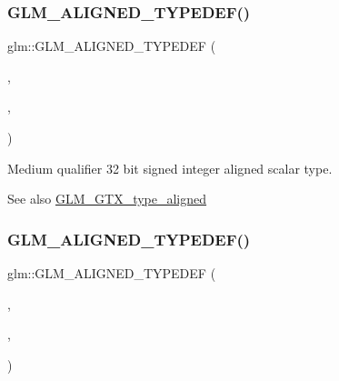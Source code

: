 \subsubsection{\texorpdfstring{G\+L\+M\+\_\+\+A\+L\+I\+G\+N\+E\+D\+\_\+\+T\+Y\+P\+E\+D\+E\+F()}{GLM\_ALIGNED\_TYPEDEF()}\hspace{0.1cm}{\footnotesize\ttfamily [15/209]}}
{\footnotesize\ttfamily glm\+::\+G\+L\+M\+\_\+\+A\+L\+I\+G\+N\+E\+D\+\_\+\+T\+Y\+P\+E\+D\+EF (\begin{DoxyParamCaption}\item[{\mbox{\hyperlink{group__gtc__type__precision_ga0660a752402702f420f13c686a7fff29}{mediump\+\_\+int32}}}]{,  }\item[{aligned\+\_\+mediump\+\_\+int32}]{,  }\item[{4}]{ }\end{DoxyParamCaption})}

Medium qualifier 32 bit signed integer aligned scalar type. \begin{DoxySeeAlso}{See also}
\mbox{\hyperlink{group__gtx__type__aligned}{G\+L\+M\+\_\+\+G\+T\+X\+\_\+type\+\_\+aligned}} 
\end{DoxySeeAlso}
\mbox{\label{group__gtx__type__aligned_gad9e5babb1dd3e3531b42c37bf25dd951}} 
\subsubsection{\texorpdfstring{G\+L\+M\+\_\+\+A\+L\+I\+G\+N\+E\+D\+\_\+\+T\+Y\+P\+E\+D\+E\+F()}{GLM\_ALIGNED\_TYPEDEF()}\hspace{0.1cm}{\footnotesize\ttfamily [16/209]}}
{\footnotesize\ttfamily glm\+::\+G\+L\+M\+\_\+\+A\+L\+I\+G\+N\+E\+D\+\_\+\+T\+Y\+P\+E\+D\+EF (\begin{DoxyParamCaption}\item[{\mbox{\hyperlink{group__gtc__type__precision_ga603c695fe5cd677d3f72a81343e19a74}{mediump\+\_\+int64}}}]{,  }\item[{aligned\+\_\+mediump\+\_\+int64}]{,  }\item[{8}]{ }\end{DoxyParamCaption})}

